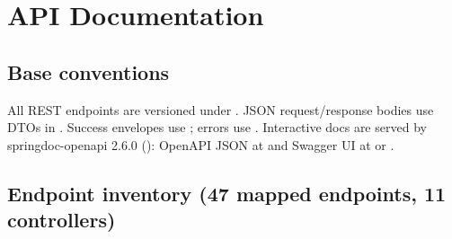\section{API Documentation}
\label{sec:api-documentation}

\subsection{Base conventions}

All REST endpoints are versioned under . JSON request/response bodies use DTOs in . Success envelopes use ; errors use . Interactive docs are served by springdoc-openapi 2.6.0 (): OpenAPI JSON at  and Swagger UI at  or .

\subsection{Endpoint inventory (47 mapped endpoints, 11 controllers)}

